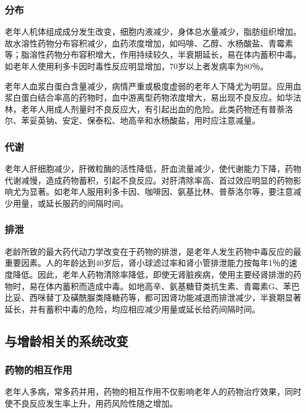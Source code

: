 \subsubsection{分布}

老年人机体组成成分发生改变，细胞内液减少，身体总水量减少，脂肪组织增加。故水溶性药物分布容积减少，血药浓度增加，如吗啡、乙醇、水杨酸盐、青霉素等；脂溶性药物分布容积增大，作用持续较久，半衰期延长，易在体内蓄积中毒。如老年人使用利多卡因时毒性反应明显增加，70岁以上者发病率为80％。

老年人血浆白蛋白含量减少，病情严重或极度虚弱的老年人下降尤为明显。应用血浆白蛋白结合率高的药物时，血中游离型药物浓度增大，易出现不良反应。如华法林，老年人用成人剂量时不良反应大，有引起出血的危险。此类药物还有普萘洛尔、苯妥英钠、安定、保泰松、地高辛和水杨酸盐，用时应注意减量。

\subsubsection{代谢}

老年人肝细胞减少，肝微粒酶的活性降低，肝血流量减少，使代谢能力下降，药物代谢减慢，造成药物蓄积，引起不良反应。对肝清除率高、首过效应明显的药物影响尤为显著。如老年人服用利多卡因、咖啡因、氨基比林、普萘洛尔等，要注意减少用量，或延长服药的间隔时间。

\subsubsection{排泄}

老龄所致的最大药代动力学改变在于药物的排泄，是老年人发生药物中毒反应的最重要因素。人的年龄达到40岁后，肾小球滤过率和肾小管排泄能力按每年1％的速度降低。因此，老年人药物清除率降低，即使无肾脏疾病，使用主要经肾排泄的药物时，易在体内蓄积而造成中毒。如地高辛、氨基糖苷类抗生素、青霉素G、苯巴比妥、西咪替丁及磺酰脲类降糖药等，都可因肾功能减退而排泄减少，半衰期显著延长，并有蓄积中毒的危险，均应相应减少用量或延长给药间隔时间。

\subsection{与增龄相关的系统改变}

\subsubsection{药物的相互作用}

老年人多病，常多药并用，药物的相互作用不仅影响老年人的药物治疗效果，同时使不良反应发生率上升，用药风险性随之增加。

